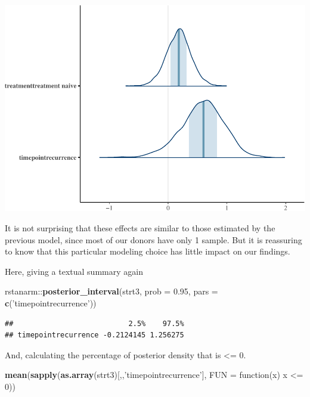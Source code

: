 \documentclass[]{article}
\newenvironment{Shaded}{\begin{snugshade}}{\end{snugshade}}
\newcommand{\KeywordTok}[1]{\textcolor[rgb]{0.13,0.29,0.53}{\textbf{{#1}}}}
\newcommand{\DataTypeTok}[1]{\textcolor[rgb]{0.13,0.29,0.53}{{#1}}}
\newcommand{\DecValTok}[1]{\textcolor[rgb]{0.00,0.00,0.81}{{#1}}}
\newcommand{\FloatTok}[1]{\textcolor[rgb]{0.00,0.00,0.81}{{#1}}}
\newcommand{\StringTok}[1]{\textcolor[rgb]{0.31,0.60,0.02}{{#1}}}
\newcommand{\NormalTok}[1]{{#1}}
\begin{document}
\includegraphics{Hierarchical_model_mutations_and_peptides_files/figure-latex/allsolid-strt3-coef-plot-1.pdf}

It is not surprising that these effects are similar to those estimated
by the previous model, since most of our donors have only 1 sample. But
it is reassuring to know that this particular modeling choice has little
impact on our findings.

Here, giving a textual summary again

\begin{Shaded}
\begin{Highlighting}[]
\NormalTok{rstanarm::}\KeywordTok{posterior_interval}\NormalTok{(strt3, }\DataTypeTok{prob =} \FloatTok{0.95}\NormalTok{, }\DataTypeTok{pars =} \KeywordTok{c}\NormalTok{(}\StringTok{'timepointrecurrence'}\NormalTok{))}
\end{Highlighting}
\end{Shaded}

\begin{verbatim}
##                           2.5%    97.5%
## timepointrecurrence -0.2124145 1.256275
\end{verbatim}

And, calculating the percentage of posterior density that is
\textless{}= 0.

\begin{Shaded}
\begin{Highlighting}[]
\KeywordTok{mean}\NormalTok{(}\KeywordTok{sapply}\NormalTok{(}\KeywordTok{as.array}\NormalTok{(strt3)[,,}\StringTok{'timepointrecurrence'}\NormalTok{], }\DataTypeTok{FUN =} \NormalTok{function(x) x <=}\StringTok{ }\DecValTok{0}\NormalTok{))}
\end{Highlighting}
\end{Shaded}
\end{document}
